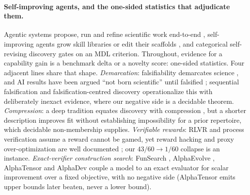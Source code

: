 \documentclass[11pt]{article}
\begin{document}
\paragraph{Self-improving agents, and the one-sided statistics that adjudicate them.} Agentic systems propose,
run and refine scientific work end-to-end \citep{coscientist2025,agenticscience2025survey}, self-improving
agents grow skill libraries or edit their scaffolds \citep{voyager2023}, and categorical self-revising
discovery \citep{selfrevising} gates on an MDL criterion. Throughout, evidence for a capability gain is a
benchmark delta or a novelty score: one-sided statistics. Four adjacent lines share that shape.
\emph{Demarcation}: falsifiability demarcates science \citep{popper1959,lakatos1978}, and AI results have been
argued ``not born scientific'' until falsified \citep{falsify2025}; sequential falsification
\citep{huang2025popper} and falsification-centred discovery \citep{liu2024aigs} operationalize this with
deliberately inexact evidence, where our negative side is a decidable theorem. \emph{Compression}: a deep
tradition equates discovery with compression \citep{grunwald2007mdl}, but a shorter description improves fit
without establishing impossibility for a prior repertoire, which decidable non-membership supplies.
\emph{Verifiable rewards}: RLVR and process verification \citep{lightman2023verify} assume a reward cannot be
gamed, yet reward hacking and proxy over-optimization are well documented
\citep{amodei2016concrete,skalse2022,gao2023overopt}; our $43/60\!\to\!1/60$ collapse is an instance.
\emph{Exact-verifier construction search}: FunSearch \citep{funsearch}, AlphaEvolve \citep{alphaevolve},
AlphaTensor \citep{alphatensor} and AlphaDev \citep{alphadev} couple a model to an exact evaluator for scalar
improvement over a fixed objective, with no negative side (AlphaTensor emits upper bounds later beaten, never
a lower bound).
\end{document}
